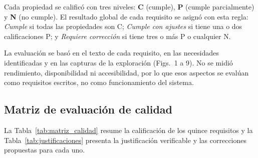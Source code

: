 \documentclass[11pt,a4paper]{article}
\begin{document}
Cada propiedad se calificó con tres niveles: \textbf{C}
(cumple), \textbf{P} (cumple parcialmente) y \textbf{N}
(no cumple). El resultado global de cada requisito se asignó
con esta regla: \emph{Cumple} si todas las propiedades son C;
\emph{Cumple con ajustes} si tiene una o dos calificaciones P;
y \emph{Requiere corrección} si tiene tres o más P o
cualquier N.

La evaluación se basó en el texto de cada requisito, en las
necesidades identificadas y en las capturas de la exploración
(Figs.~1 a 9). No se midió rendimiento,
disponibilidad ni accesibilidad, por lo que esos aspectos se
evalúan como requisitos escritos, no como funcionamiento del
sistema.

\subsection{Matriz de evaluación de calidad}

La Tabla~\ref{tab:matriz_calidad} resume la calificación de
los quince requisitos y la Tabla~\ref{tab:justificaciones}
presenta la justificación verificable y las correcciones
propuestas para cada uno.

\begingroup
\footnotesize
\setlength{\tabcolsep}{2.5pt}
\renewcommand{\arraystretch}{1.15}
\end{document}
